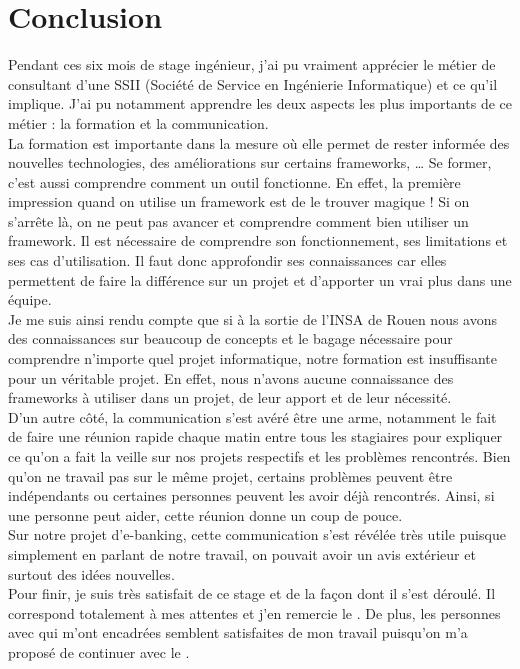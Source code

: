 \chapter*{Conclusion}

Pendant ces six mois de stage ingénieur, j'ai pu vraiment apprécier le métier de consultant d'une SSII (Société de Service en Ingénierie Informatique) et ce qu'il implique. J'ai pu notamment apprendre les deux aspects les plus importants de ce métier : la formation et la communication.\\

La formation est importante dans la mesure où elle permet de rester informée des nouvelles technologies, des améliorations sur certains frameworks, \dots{} Se former, c'est aussi comprendre comment un outil fonctionne. En effet, la première impression quand on utilise un framework est de le trouver magique ! Si on s'arrête là, on ne peut pas avancer et comprendre comment bien utiliser un framework. Il est nécessaire de comprendre son fonctionnement, ses limitations et ses cas d'utilisation. Il faut donc approfondir ses connaissances car elles permettent de faire la différence sur un projet et d'apporter un vrai plus dans une équipe.\\

Je me suis ainsi rendu compte que si à la sortie de l'INSA de Rouen nous avons des connaissances sur beaucoup de concepts et le bagage nécessaire pour comprendre n'importe quel projet informatique, notre formation est insuffisante pour un véritable projet. En effet, nous n'avons aucune connaissance des frameworks à utiliser dans un projet, de leur apport et de leur nécessité.\\

D'un autre côté, la communication s'est avéré être une arme, notamment le fait de faire une réunion rapide chaque matin entre tous les stagiaires pour expliquer ce qu'on a fait la veille sur nos projets respectifs et les problèmes rencontrés. Bien qu'on ne travail pas sur le même projet, certains problèmes peuvent être indépendants ou certaines personnes peuvent les avoir déjà rencontrés. Ainsi, si une personne peut aider, cette réunion donne un coup de pouce.\\

Sur notre projet d'e-banking, cette communication s'est révélée très utile puisque simplement en parlant de notre travail, on pouvait avoir un avis extérieur et surtout des idées nouvelles.\\

Pour finir, je suis très satisfait de ce stage et de la façon dont il s'est déroulé. Il correspond totalement à mes attentes et j'en remercie le \excilysGroup{}. De plus, les personnes avec qui m'ont encadrées semblent satisfaites de mon travail puisqu'on m'a proposé de continuer avec le \excilysGroup{}.